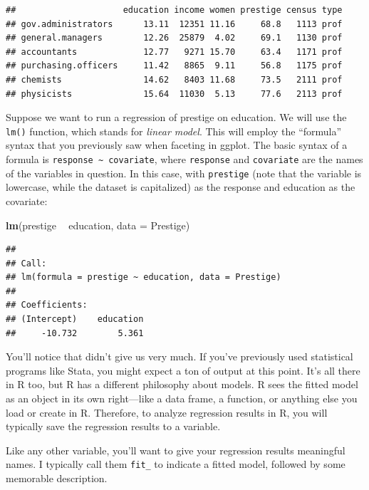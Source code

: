 \documentclass[12pt,oneside,openany]{book}
\newenvironment{Shaded}{\begin{snugshade}}{\end{snugshade}}
\newcommand{\KeywordTok}[1]{\textcolor[rgb]{0.13,0.29,0.53}{\textbf{#1}}}
\newcommand{\DataTypeTok}[1]{\textcolor[rgb]{0.13,0.29,0.53}{#1}}
\newcommand{\StringTok}[1]{\textcolor[rgb]{0.31,0.60,0.02}{#1}}
\newcommand{\OperatorTok}[1]{\textcolor[rgb]{0.81,0.36,0.00}{\textbf{#1}}}
\newcommand{\NormalTok}[1]{#1}
\begin{document}
\begin{verbatim}
##                     education income women prestige census type
## gov.administrators      13.11  12351 11.16     68.8   1113 prof
## general.managers        12.26  25879  4.02     69.1   1130 prof
## accountants             12.77   9271 15.70     63.4   1171 prof
## purchasing.officers     11.42   8865  9.11     56.8   1175 prof
## chemists                14.62   8403 11.68     73.5   2111 prof
## physicists              15.64  11030  5.13     77.6   2113 prof
\end{verbatim}

Suppose we want to run a regression of prestige on education. We will
use the \texttt{lm()} function, which stands for \emph{linear model}.
This will employ the ``formula'' syntax that you previously saw when
faceting in ggplot. The basic syntax of a formula is
\texttt{response\ \textasciitilde{}\ covariate}, where \texttt{response}
and \texttt{covariate} are the names of the variables in question. In
this case, with \texttt{prestige} (note that the variable is lowercase,
while the dataset is capitalized) as the response and education as the
covariate:

\begin{Shaded}
\begin{Highlighting}[]
\KeywordTok{lm}\NormalTok{(prestige }\OperatorTok{~}\StringTok{ }\NormalTok{education, }\DataTypeTok{data =}\NormalTok{ Prestige)}
\end{Highlighting}
\end{Shaded}

\begin{verbatim}
## 
## Call:
## lm(formula = prestige ~ education, data = Prestige)
## 
## Coefficients:
## (Intercept)    education  
##     -10.732        5.361
\end{verbatim}

You'll notice that didn't give us very much. If you've previously used
statistical programs like Stata, you might expect a ton of output at
this point. It's all there in R too, but R has a different philosophy
about models. R sees the fitted model as an object in its own
right---like a data frame, a function, or anything else you load or
create in R. Therefore, to analyze regression results in R, you will
typically save the regression results to a variable.

Like any other variable, you'll want to give your regression results
meaningful names. I typically call them \texttt{fit\_} to indicate a
fitted model, followed by some memorable description.
\end{document}
